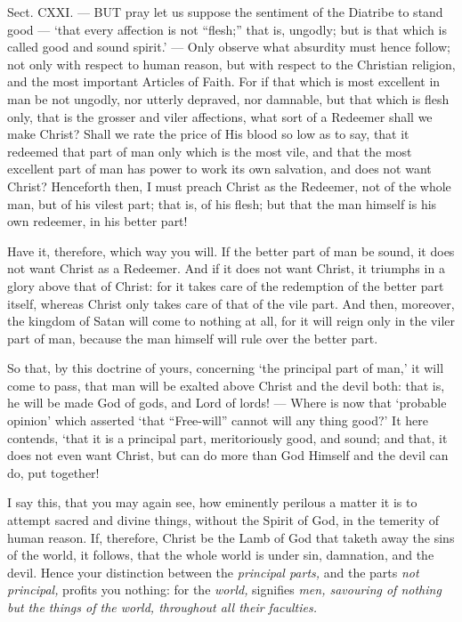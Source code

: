 Sect. CXXI. — BUT pray let us suppose the sentiment of the Diatribe to stand good — ‘that every affection is not “flesh;” that is, ungodly; but is that which is called good and sound spirit.’ — Only observe what absurdity must hence follow; not only with respect to human reason, but with respect to the Christian religion, and the most important Articles of Faith. For if that which is most excellent in man be not ungodly, nor utterly depraved, nor damnable, but that which is flesh only, that is the grosser and viler affections, what sort of a Redeemer shall we make Christ? Shall we rate the price of His blood so low as to say, that it redeemed that part of man only which is the most vile, and that the most excellent part of man has power to work its own salvation, and does not want Christ? Henceforth then, I must preach Christ as the Redeemer, not of the whole man, but of his vilest part; that is, of his flesh; but that the man himself is his own redeemer, in his better part!

Have it, therefore, which way you will. If the better part of man be sound, it does not want Christ as a Redeemer. And if it does not want Christ, it triumphs in a glory above that of Christ: for it takes care of the redemption of the better part itself, whereas Christ only takes care of that of the vile part. And then, moreover, the kingdom of Satan will come to nothing at all, for it will reign only in the viler part of man, because the man himself will rule over the better part.

So that, by this doctrine of yours, concerning ‘the principal part of man,’ it will come to pass, that man will be exalted above Christ and the devil both: that is, he will be made God of gods, and Lord of lords! — Where is now that ‘probable opinion’ which asserted ‘that “Free-will” cannot will any thing good?’ It here contends, ‘that it is a principal part, meritoriously good, and sound; and that, it does not even want Christ, but can do more than God Himself and the devil can do, put together!

I say this, that you may again see, how eminently perilous a matter it is to attempt sacred and divine things, without the Spirit of God, in the temerity of human reason. If, therefore, Christ be the Lamb of God that taketh away the sins of the world, it follows, that the whole world is under sin, damnation, and the devil. Hence your distinction between the \emph{principal parts, }and the parts \emph{not principal, }profits you nothing: for the \emph{world, }signifies \emph{men, savouring of nothing but the things of the world, throughout all their faculties.}

